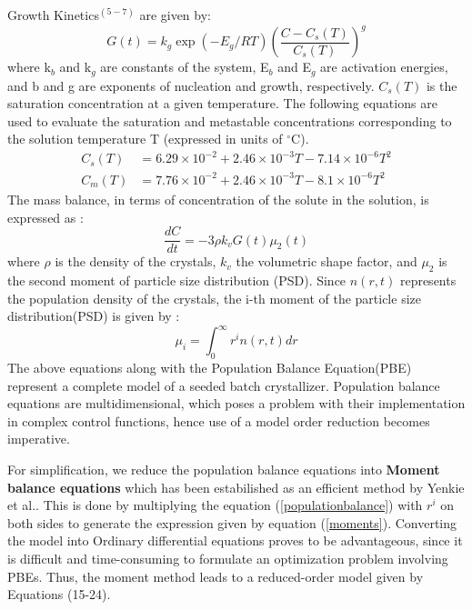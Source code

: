 \documentclass[3p,times]{elsarticle}
\begin{document}
Growth Kinetics$^{(5-7)}$ are given by:
\begin{equation}
G(t) = k_{g}\exp{\left(-E_{g}/RT \right)}\left(\frac{C - C_{s}(T)}{C_{s}(T)}\right)^{g}
\end{equation}
where k$_{b}$ and k$_{g}$ are constants of the system, E$_{b}$ and E$_{g}$ are activation energies, and b and g are exponents of nucleation and growth, respectively. $C_{s}(T)$ is the saturation concentration at a given temperature. The following equations are used to evaluate the saturation and metastable concentrations corresponding to the solution temperature T (expressed in units of $^\circ$C)\cite{shi}. \\
\begin{align}
C_{s}(T) &= 6.29\times10^{-2} + 2.46\times10^{-3}T - 7.14\times10^{-6}T^{2} \\
C_{m}(T) &= 7.76\times10^{-2} + 2.46\times10^{-3}T - 8.1\times10^{-6}T^{2} \label{meta}
\end{align} 
The mass balance, in terms of concentration of the solute in the solution, is expressed as :
\begin{equation}
\frac{dC}{dt} = -3\rho{}k_{v}G(t)\mu_{2}(t)
\end{equation}
where $\rho{}$ is the density of the crystals, $k_{v}$ the volumetric shape factor, and $\mu_{2}$ is the second moment of particle size distribution (PSD).
Since $n(r,t)$ represents the population density of the crystals, the i-th moment of the particle size distribution(PSD) is given by :
\begin{equation} \label{moments}
\mu_{i} = \int_{0}^{\infty} r^{i}n(r,t) dr
\end{equation}
The above equations along with the Population Balance Equation(PBE) represent a complete model of a seeded batch crystallizer. 
Population balance equations are multidimensional, which poses a problem with their implementation in complex control functions, hence use of a model order reduction becomes imperative.\par
For simplification, we reduce the population balance equations into \textbf{Moment balance equations} which has been estabilished as an efficient method by Yenkie et al.\cite{yenkie}. This is done by multiplying the equation (\ref{populationbalance})  with $r^{i}$ on both sides to generate the expression given by equation (\ref{moments}). Converting the model into Ordinary differential equations proves to be advantageous, since it is difficult and time-consuming to formulate an optimization problem involving PBEs. Thus, the moment method leads to a reduced-order model given by Equations (15-24).\\ 
\end{document}
